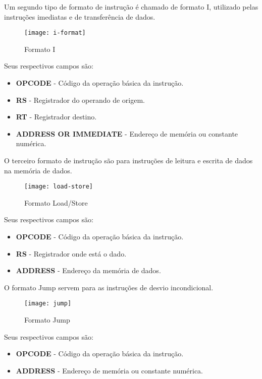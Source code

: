 	 Um segundo tipo de formato de instrução é chamado de formato I, utilizado pelas instruções imediatas e de transferência de dados.
	\begin{figure}[H]
    	\centering
    	\texttt{[image: i-format]}
    	\caption{Formato I}
		\label{i_format}
  	\end{figure}
Seus respectivos campos são:
	\begin{itemize}
	\item \textbf{OPCODE} - Código da operação básica da instrução.
	\item \textbf{RS} - Registrador do operando de origem.
	\item \textbf{RT} - Registrador destino.
	\item \textbf{ADDRESS OR IMMEDIATE} - Endereço de memória ou constante numérica.
\end{itemize}	  	
	
 O terceiro formato de instrução são para instruções de leitura e escrita de dados na memória de dados.  	
  	\begin{figure}[H]
    	\centering
    	\texttt{[image: load-store]}
    	\caption{Formato Load/Store}
		\label{loadstore}
  	\end{figure}  	
Seus respectivos campos são:
	\begin{itemize}
	\item \textbf{OPCODE} - Código da operação básica da instrução.
	\item \textbf{RS} - Registrador onde está o dado.
	\item \textbf{ADDRESS} - Endereço da memória de dados.
\end{itemize}

 O formato Jump servem para as instruções de desvio incondicional.  	
   	\begin{figure}[H]
    	\centering
    	\texttt{[image: jump]}
    	\caption{Formato Jump}
		\label{jump}
  	\end{figure}
Seus respectivos campos são:
	\begin{itemize}
	\item \textbf{OPCODE} - Código da operação básica da instrução.
	\item \textbf{ADDRESS} - Endereço de memória ou constante numérica.
\end{itemize}
  	
 